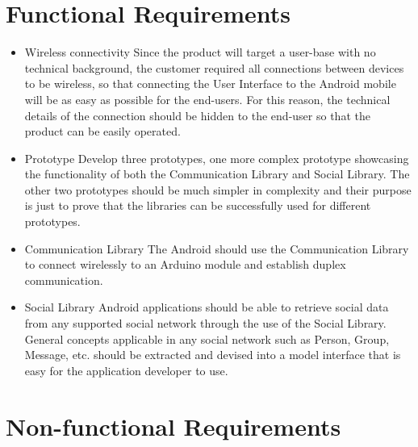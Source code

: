 \section{Functional Requirements}

\begin{itemize}
\item{Wireless connectivity}\newline
Since the product will target a user-base with no technical background,
the customer required all connections between devices to be wireless,
so that connecting the User Interface to the Android mobile will be
as easy as possible for the end-users. For this reason, the technical
details of the connection should be hidden to the end-user so that
the product can be easily operated.

\item{Prototype}\newline
Develop three prototypes, one more complex prototype showcasing the 
functionality of both the Communication Library and Social Library. The other
two prototypes should be much simpler in complexity and their purpose is just to
prove that the libraries can be successfully used for different prototypes.

\item{Communication Library}\newline
The Android should use the Communication Library to connect wirelessly 
to an Arduino module and establish duplex communication.

\item{Social Library}\newline
Android applications should be able to retrieve social data from any 
supported social network through the use of the Social Library. General 
concepts applicable in any social network such as Person, Group, Message, etc.
should be extracted and devised into a model interface that is easy for the application
developer to use.
\end{itemize}


\section{Non-functional Requirements}

